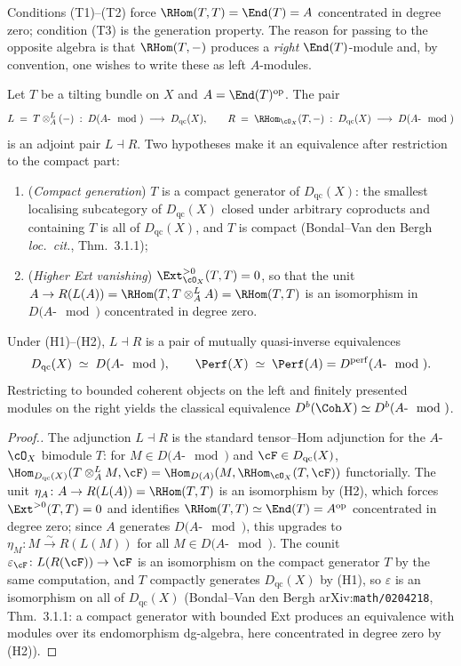 Conditions (T1)--(T2) force $\RHom(T, T) = \End(T) = A$ concentrated in degree
zero; condition (T3) is the generation property. The reason for passing to the
opposite algebra is that $\RHom(T, -)$ produces a \emph{right} $\End(T)$-module
and, by convention, one wishes to write these as left $A$-modules.

\begin{theorem}
\label{thm:derived-morita-tilting}
Let $T$ be a tilting bundle on $X$ and $A = \End(T)^{\mathrm{op}}$.
The pair
\[
 L \;=\; T \otimes^{L}_{A} (-) \;:\; D(A\text{-}\mod) \;\longrightarrow\; D_{\mathrm{qc}}(X),
 \qquad
 R \;=\; \RHom_{\cO_X}(T, -) \;:\; D_{\mathrm{qc}}(X) \;\longrightarrow\; D(A\text{-}\mod)
\]
is an adjoint pair $L \dashv R$. Two hypotheses make it an equivalence after
restriction to the compact part:
\begin{enumerate}
\item[(H1)] (\emph{Compact generation}) $T$ is a compact generator of
$D_{\mathrm{qc}}(X)$: the smallest localising subcategory of $D_{\mathrm{qc}}(X)$
closed under arbitrary coproducts and containing $T$ is all of $D_{\mathrm{qc}}(X)$,
and $T$ is compact (Bondal--Van den Bergh \emph{loc.\ cit.}, Thm.~3.1.1);
\item[(H2)] (\emph{Higher Ext vanishing}) $\Ext^{>0}_{\cO_X}(T, T) = 0$,
so that the unit $A \to R(L(A)) = \RHom(T, T \otimes^L_A A) = \RHom(T, T)$ is an
isomorphism in $D(A\text{-}\mod)$ concentrated in degree zero.
\end{enumerate}
Under (H1)--(H2), $L \dashv R$ is a pair of mutually quasi-inverse equivalences
\[
 D_{\mathrm{qc}}(X) \;\simeq\; D(A\text{-}\mod), \qquad
 \Perf(X) \;\simeq\; \Perf(A) = D^{\mathrm{perf}}(A\text{-}\mod).
\]
Restricting to bounded coherent objects on the left and finitely presented
modules on the right yields the classical equivalence
$D^{b}(\Coh X) \simeq D^{b}(A\text{-}\mod)$.
\end{theorem}

\begin{proof}[Proof.]
The adjunction $L \dashv R$ is the standard tensor--Hom adjunction for the
$A$-$\cO_X$ bimodule $T$: for $M \in D(A\text{-}\mod)$ and $\cF \in D_{\mathrm{qc}}(X)$,
$\Hom_{D_{\mathrm{qc}}(X)}(T \otimes^L_A M, \cF) = \Hom_{D(A)}(M, \RHom_{\cO_X}(T, \cF))$
functorially. The unit $\eta_A \colon A \to R(L(A)) = \RHom(T, T)$ is an
isomorphism by (H2), which forces $\Ext^{>0}(T, T) = 0$ and identifies $\RHom(T,T)
\simeq \End(T) = A^{\mathrm{op}}$ concentrated in degree zero; since $A$ generates
$D(A\text{-}\mod)$, this upgrades to $\eta_M \colon M \xrightarrow{\sim} R(L(M))$
for all $M \in D(A\text{-}\mod)$. The counit $\varepsilon_\cF \colon L(R(\cF)) \to
\cF$ is an isomorphism on the compact generator $T$ by the same computation, and
$T$ compactly generates $D_{\mathrm{qc}}(X)$ by (H1), so $\varepsilon$ is an
isomorphism on all of $D_{\mathrm{qc}}(X)$ (Bondal--Van den Bergh
arXiv:\texttt{math/0204218}, Thm.~3.1.1: a compact generator with bounded Ext
produces an equivalence with modules over its endomorphism dg-algebra, here
concentrated in degree zero by (H2)).
\end{proof}

